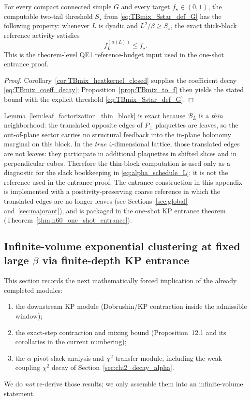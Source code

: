 \begin{corollary}\label{cor:TBmix_reference_budget_closed}
For every compact connected simple $G$ and every target $f_\star\in(0,1)$, the computable two-tail threshold $S_\star$ from \eqref{eq:TBmix_Sstar_def_G} has the following property:
whenever $L$ is dyadic and $L^2/\beta\ge S_\star$, the exact thick-block reference activity satisfies
\[
 f_L^{(\alpha(L))}\le f_\star.
\]
This is the theorem-level QE1 reference-budget input used in the one-shot entrance proof.
\end{corollary}

\begin{proof}
Corollary~\ref{cor:TBmix_heatkernel_closed} supplies the coefficient decay \eqref{eq:TBmix_coeff_decay}; Proposition~\ref{prop:TBmix_to_f} then yields the stated bound with the explicit threshold \eqref{eq:TBmix_Sstar_def_G}.
\end{proof}

\begin{remark}
Lemma~\ref{lem:leaf_factorization_thin_block} is exact because $\mathcal B_L$ is a \emph{thin} neighborhood:
the translated opposite edges of $P_\perp$ plaquettes are leaves, so the out-of-plane sector carries no
structural feedback into the in-plane holonomy marginal on this block.
In the \emph{true} $4$-dimensional lattice, those translated edges are not leaves: they participate in additional plaquettes
in shifted slices and in perpendicular cubes.
Therefore the thin-block computation is used only as a diagnostic for the slack bookkeeping in \eqref{eq:alpha_schedule_L}; it is not the reference used in the entrance proof.
The entrance construction in this appendix is implemented with a positivity-preserving coarse reference in which the translated edges are no longer leaves
(see Sections~\ref{sec:global} and~\ref{sec:majorant}), and is packaged in the one-shot KP entrance theorem (Theorem~\ref{thm:h60_one_shot_entrance}).
\end{remark}

\subsection{Infinite-volume exponential clustering at fixed large \texorpdfstring{$\beta$}{beta} via finite-depth KP entrance}\label{sec:iv_clustering}

This section records the next mathematically forced implication of the already completed modules:
\begin{enumerate}[leftmargin=*]
\item the downstream KP module (Dobrushin/KP contraction inside the admissible window);
\item the exact-step contraction and mixing bound (Proposition~12.1 and its corollaries in the current numbering);
\item the $\alpha$-pivot slack analysis and $\chi^2$-transfer module, including the weak-coupling $\chi^2$ decay
of Section~\ref{sec:chi2_decay_alpha}.
\end{enumerate}
We do \emph{not} re-derive those results; we only assemble them into an infinite-volume statement.

